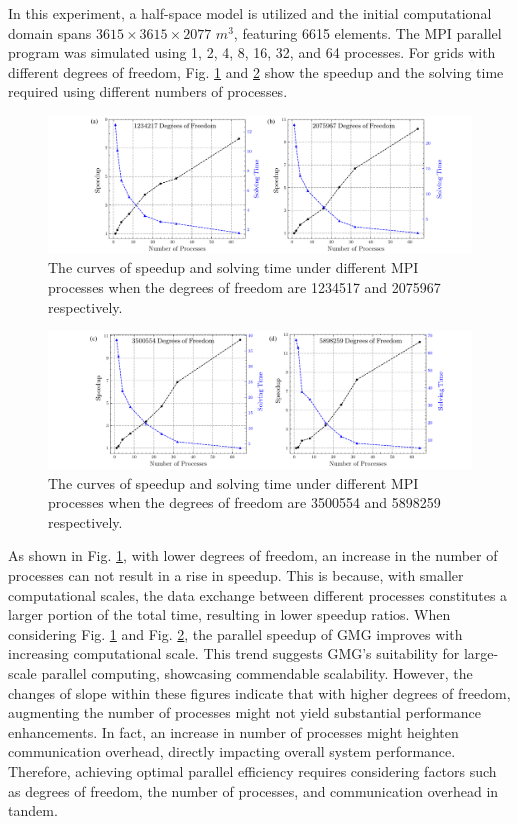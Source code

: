 \documentclass[extra, referee]{gji}
\begin{document}
In this experiment, a half-space model is utilized and the initial computational domain spans $3615 \times 3615 \times 2077$ $m^3$, featuring 6615 elements. The MPI parallel program was simulated using 1, 2, 4, 8, 16, 32, and 64 processes. For grids with different degrees of freedom, Fig. \ref{fig:results_parallel1} and \ref{fig:results_parallel2} show the speedup and the solving time required using different numbers of processes.

\begin{figure}
  \centering
  \includegraphics[width=1\textwidth]{fig/results_parallel1.pdf}
  \caption{The curves of speedup and solving time under different MPI processes when the degrees of freedom are 1234517 and 2075967 respectively.}
  \label{fig:results_parallel1}
\end{figure}
\begin{figure}
  \centering
  \includegraphics[width=1\textwidth]{fig/results_parallel2.pdf}
  \caption{The curves of speedup and solving time under different MPI processes when the degrees of freedom are 3500554 and 5898259 respectively.}
  \label{fig:results_parallel2}
\end{figure}


As shown in Fig. \ref{fig:results_parallel1}, with lower degrees of freedom, an increase in
the number of processes can not result in a rise in speedup. This is because,
with smaller computational scales, the data exchange between different processes
constitutes a larger portion of the total time, resulting in lower speedup
ratios. When considering Fig. \ref{fig:results_parallel1} and Fig. \ref{fig:results_parallel2}, the
parallel speedup of GMG improves with increasing computational scale. This trend
suggests GMG's suitability for large-scale parallel computing, showcasing
commendable scalability. However, the changes of slope within these figures
indicate that with higher degrees of freedom, augmenting the number of processes
might not yield substantial performance enhancements. In fact, an increase in
number of processes might heighten communication overhead, directly impacting
overall system performance. Therefore, achieving optimal parallel efficiency
requires considering factors such as degrees of freedom, the number of
processes, and communication overhead in tandem.





\end{document}

